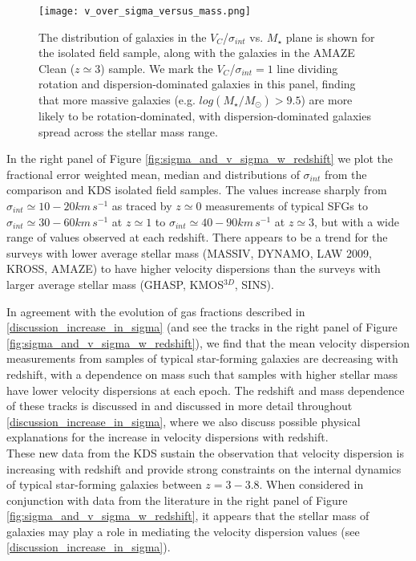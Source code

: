 \documentclass[fleqn,usenatbib]{mnras}
\begin{document}
\begin{figure}
    \centering \hspace{-1.13cm}
    \texttt{[image: v\_over\_sigma\_versus\_mass.png]}
    \caption{The distribution of galaxies in the $V_{C}$/$\sigma_{int}$ vs. $M_{\star}$ plane is shown for the isolated field sample, along with the galaxies in the AMAZE Clean ($z\simeq3$) sample.
    We mark the $V_{C}$/$\sigma_{int}=1$ line dividing rotation and dispersion-dominated galaxies in this panel, finding that more massive galaxies (e.g. $log(M_{\star}/M_{\odot}) > 9.5$) are more likely to be rotation-dominated, with dispersion-dominated galaxies spread across the stellar mass range.}
    \label{fig:v_sig_and_v}
\end{figure}

In the right panel of Figure \ref{fig:sigma_and_v_sigma_w_redshift} we plot the fractional error weighted mean, median and distributions of $\sigma_{int}$ from the comparison and KDS isolated field samples.
The values increase sharply from $\sigma_{int}\simeq10-20km\,s^{-1}$ as traced by $z\simeq0$ measurements of typical SFGs to $\sigma_{int}\simeq30-60km\,s^{-1}$ at $z\simeq1$ to $\sigma_{int}\simeq40-90km\,s^{-1}$ at $z\simeq3$, but with a wide range of values observed at each redshift.
There appears to be a trend for the surveys with lower average stellar mass (MASSIV, DYNAMO, LAW 2009, KROSS, AMAZE) to have higher velocity dispersions than the surveys with larger average stellar mass (GHASP, KMOS$^{3D}$, SINS).

In agreement with the evolution of gas fractions described in \cref{discussion_increase_in_sigma} (and see the tracks in the right panel of Figure \ref{fig:sigma_and_v_sigma_w_redshift}), we find that the mean velocity dispersion measurements from samples of typical star-forming galaxies are decreasing with redshift, with a dependence on mass such that samples with higher stellar mass have lower velocity dispersions at each epoch.
The redshift and mass dependence of these tracks is discussed in \cite{Wisnioski2015} and discussed in more detail throughout \cref{discussion_increase_in_sigma}, where we also discuss possible physical explanations for the increase in velocity dispersions with redshift. \\  


These new data from the KDS sustain the observation that velocity dispersion is increasing with redshift and provide strong constraints on the internal dynamics of typical star-forming galaxies between $z=3-3.8$.
When considered in conjunction with data from the literature in the right panel of Figure \ref{fig:sigma_and_v_sigma_w_redshift}, it appears that the stellar mass of galaxies may play a role in mediating the velocity dispersion values (see \cref{discussion_increase_in_sigma}).
\end{document}
